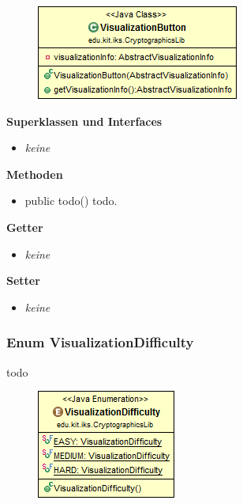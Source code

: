 \documentclass{article}
\begin{document}
      \begin{figure}[H]
        \centering
        \includegraphics{resources/edu-kit-iks-CryptographicsLib-VisualizationButton}
      \end{figure}
	
      \textbf{Superklassen und Interfaces}
      \begin{itemize}
        \item \textit{keine}
      \end{itemize}
	
      \textbf{Methoden}
      \begin{itemize}
        \item public todo() \newline
          todo.
      \end{itemize}
      
      \textbf{Getter}
      \begin{itemize}
		\item \textit{keine}
      \end{itemize}
      
      \textbf{Setter}
      \begin{itemize}
        \item \textit{keine}
      \end{itemize}
	
	\subsubsection{Enum VisualizationDifficulty}
	  todo
	
      \begin{figure}[H]
        \centering
        \includegraphics{resources/edu-kit-iks-CryptographicsLib-VisualizationDifficulty}
      \end{figure}
\end{document}
